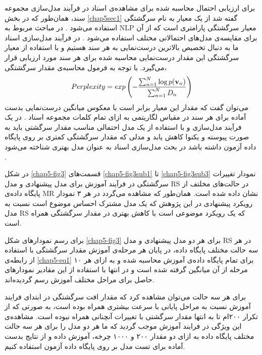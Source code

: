 برای ارزیابی احتمال محاسبه شده برای مشاهده‌ی اسناد در فرآیند مدل‌سازی مجموعه سند، همان‌طور که در بخش 
\ref{chap5sec1}
گفته شد از یک معیار به نام سرگشتگی استفاده می‌‌شود
\cite{blei2003latent}.
در مباحث مربوط به 
NLP
معیار سرگشتگی پارامتری است که از آن برای مقایسه‌ی مدل‌های احتمالاتی مختلف استفاده می‌شود
\cite{blei2003latent}.
 در فرآیند مدل‌سازی اسناد ما به دنبال تخصیص بالاترین درست‌نمایی به هر سند هستیم و با استفاده از معیار سرگشتگی این مقدار درست‌نمایی 
 محاسبه ‌شده برای هر سند مورد ارزیابی قرار می‌‌گیرد. با توجه به فرمول محاسبه‌ی مقدار سرگشتگی،
\begin{align}
	\centering
	\label{chap5-eq1}
	Perplexity = exp\left( - \dfrac{\sum_{n=1}^{N}\log p(\textbf{v}_n)}{\sum_{n=1}^{N}D_n} \right)
\end{align}
می‌‌توان گفت که مقدار این معیار برابر است با معکوس میانگین درست‌نمایی بدست آماده برای هر سند در مقیاس لگاریتمی به ازای تمام کلمات مجموعه اسناد
\cite{blei2003latent}.
 در یک فرآیند مدل‌سازی و با استفاده از یک مدل احتمالی‌ مناسب مقدار سرگشتی باید به صورت پیوسته و یکنوا کاهش یابد و مدلی که مقدار سرگشتگی کمتری بر روی پایگاه داده آزمون داشته باشد در بحث مدل‌سازی اسناد به عنوان مدل بهتری شناخته می‌‌شود
\cite{blei2003latent}.


در شکل 
\ref{chap5-fig3}
قسمت‌های
\ref{chap5-fig3sub1}
 تا
 \ref{chap5-fig3sub3}
  نمودار تغییرات سرگشتگی در فرآیند آموزش برای مدل پیشنهادی و مدل 
RS
در حالت‌های مخلتف از پایگاه داده‌ی 
MR
نشان داده شده است. همان‌طور که مشاهده می‌‌گردد در هر ۳ نمودار رویکرد پیشنهادی در این پژوهش که یک مدل مشترک احساس موضوع است نسبت به مدل 
RS
که یک رویکرد موضوعی است با کاهش بهتری در مقدار سرگشتگی همراه است. 

برای رسم نمودارهای شکل
\ref{chap5-fig3}
برای هر دو مدل پیشنهادی و مدل
RS
در هر سه‌ حالت مختلف پایگاه داده، در پایان هر مرحله‌ی آموزش مقدار سرگشتگی با استفاده از رابطه‌ی
\ref{chap5-eq1}
برای تمام پایگاه داده‌ی ‌آموزش محاسبه شده و به ازای هر ۱۰ مرحله از آن میانگین گرفته شده است و در انتها با استفاده از این مقادیر نمودارهای حاصل برای مراحل مختلف آموزش رسم گردیده‌اند.

برای هر سه حالت می‌‌توان مشاهده کرد که مقدار افت سرگشتگی در ابتدای فرایند آموزش نسبت به مراحل پایانی با سرعت بیشتری همراه بوده است، به صورتی‌ که از تکرار ۲۰۰ام تا به انتها مقدار سرگشتی با تغییرات آنچنانی همراه نبوده است. مشاهده‌ی این ویژگی‌ در فرایند آموزش موجب گردید که ما هر دو مدل را برای هر سه حالت مختلف پایگاه داده به ازای دو مقدار ۲۰۰ و ۱۰۰۰ چرخه‌، آموزش داده و از نتایج بدست آماده برای تست مدل بر روی پایگاه داده آزمون استفاده کنیم. 

